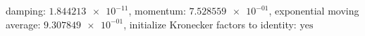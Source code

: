 damping: $\num[scientific-notation=true]{1.844213e-11}$, momentum: $\num[scientific-notation=true]{7.528559e-01}$, exponential moving average: $\num[scientific-notation=true]{9.307849e-01}$, initialize Kronecker factors to identity: $\text{yes}$